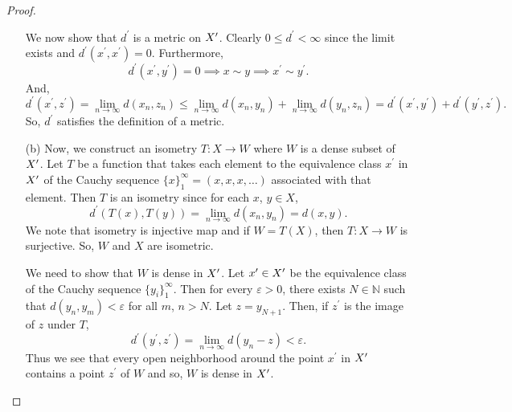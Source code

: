 \begin{solution}
\begin{proof}
\begin{enumerate}
                    \vspace*{3mm}
                    We now show that $d^\prime$ is a metric on
                    $X^\prime$. Clearly $0\leq d^\prime<\infty$ since
                    the limit exists and $d^\prime(x^\prime,
                    x^\prime)=0$. Furthermore,
                    $$d^\prime(x^\prime,
                    y^\prime)=0\implies x\sim y\implies x^\prime
                    \sim y^\prime.$$
                    And,
                    $$d^\prime(x^\prime,z^\prime)=
                    \lim_{n\to\infty}{d(x_n,z_n)}\leq
                    \lim_{n\to\infty}{d(x_n,y_n)}+
                    \lim_{n\to\infty}{d(y_n,z_n)}
                    =d^\prime(x^\prime,y^\prime)+
                    d^\prime(y^\prime,z^\prime).$$
                    So, $d^\prime$ satisfies the definition of a metric.
            
                    \vspace*{3mm}
                    \item[(b)] Now, we construct an isometry
                    $T:X\to W$ where $W$ is a dense subset of
                    $X^\prime$. Let $T$ be a function that takes
                    each element to the
                    equivalence
                    class $x^\prime$ in $X^\prime$ of the
                    Cauchy sequence $\{x\}_1^\infty=
                    (x,x,x,\ldots)$ associated with that element.
                    Then $T$ is an isometry since for each
                    $x$, $y\in X$,
                    $$d^\prime(T(x),T(y))=\lim_{n\to\infty}
                    {d(x_n,y_n)}=d(x,y).$$
                    We note that isometry is injective map and
                    if $W=T(X)$, then $T:X\to W$ is surjective. So,
                    $W$ and $X$ are isometric.
            
                    \vspace*{3mm}
                    We need to show that $W$ is dense in $X^\prime$.
                    Let $x^\prime\in X^\prime$ be the equivalence
                    class of the Cauchy sequence $\{y_i\}_1^\infty$.
                    Then for every $\varepsilon>0$, there exists $N
                    \in \mathbb{N}$ such that
                    $d(y_n,y_m)<\varepsilon$ for all $m$, $n>N$.
                    Let $z=y_{N+1}$. Then, if $z^\prime$ is the image
                    of $z$ under $T$,
                    $$d^\prime(y^\prime,z^\prime)=
                    \lim_{n\to\infty}{d(y_n-z)}<\varepsilon.$$
                    Thus we see that every open neighborhood
                    around the point $x^\prime$ in $X^\prime$
                    contains a point $z^\prime$ of $W$ and so,
                    $W$ is dense in $X^\prime$.
        

\end{enumerate}
\end{proof}
\end{solution}

